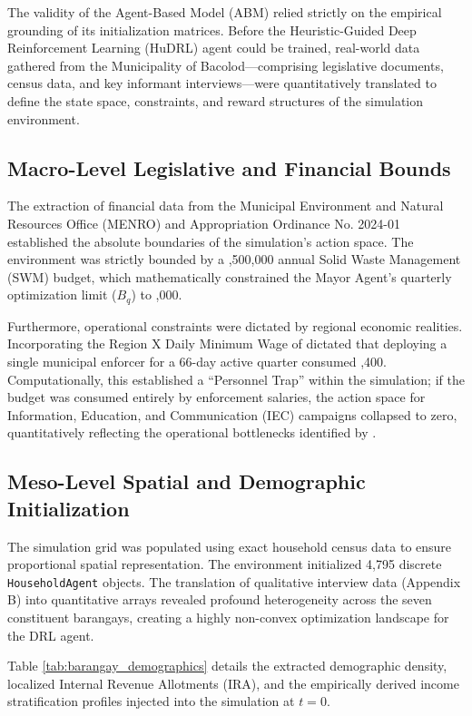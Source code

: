 The validity of the Agent-Based Model (ABM) relied strictly on the empirical grounding of its initialization matrices. Before the Heuristic-Guided Deep Reinforcement Learning (HuDRL) agent could be trained, real-world data gathered from the Municipality of Bacolod—comprising legislative documents, census data, and key informant interviews—were quantitatively translated to define the state space, constraints, and reward structures of the simulation environment. 

\subsection{Macro-Level Legislative and Financial Bounds}
The extraction of financial data from the Municipal Environment and Natural Resources Office (MENRO) and Appropriation Ordinance No. 2024-01 established the absolute boundaries of the simulation's action space. The environment was strictly bounded by a ,500,000 annual Solid Waste Management (SWM) budget, which mathematically constrained the Mayor Agent's quarterly optimization limit ($B_q$) to ,000. 

Furthermore, operational constraints were dictated by regional economic realities. Incorporating the Region X Daily Minimum Wage of  dictated that deploying a single municipal enforcer for a 66-day active quarter consumed ,400. Computationally, this established a ``Personnel Trap'' within the simulation; if the budget was consumed entirely by enforcement salaries, the action space for Information, Education, and Communication (IEC) campaigns collapsed to zero, quantitatively reflecting the operational bottlenecks identified by \cite{Nishimura2022}.

\subsection{Meso-Level Spatial and Demographic Initialization}
The simulation grid was populated using exact household census data to ensure proportional spatial representation. The environment initialized 4,795 discrete \texttt{HouseholdAgent} objects. The translation of qualitative interview data (Appendix B) into quantitative arrays revealed profound heterogeneity across the seven constituent barangays, creating a highly non-convex optimization landscape for the DRL agent. 

Table \ref{tab:barangay_demographics} details the extracted demographic density, localized Internal Revenue Allotments (IRA), and the empirically derived income stratification profiles injected into the simulation at $t=0$.

